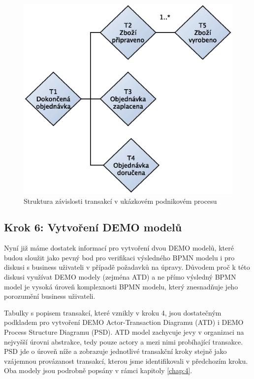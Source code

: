 \begin{figure}[htbp]
\centering
\includegraphics[scale=0.7]{obrazky/result-structure-chart}
\caption{Struktura závislosti transakcí v ukázkovém podnikovém procesu}
\label{fig:result_structure_chart}
\end{figure}

\subsection{Krok 6: Vytvoření DEMO modelů}
Nyní již máme dostatek informací pro vytvoření dvou DEMO modelů, které budou sloužit jako pevný bod pro verifikaci výsledného BPMN modelu i pro diskusi s business uživateli v případě požadavků na úpravy. Důvodem proč k této diskusi využívat DEMO modely (zejména ATD) a ne přímo výsledný BPMN model je vysoká úroveň komplexnosti BPMN modelu, který znesnadňuje jeho porozumění business uživateli.

Tabulky s popisem transakcí, které vznikly v kroku 4, jsou dostatečným podkladem pro vytvoření DEMO Actor-Transaction Diagramu (ATD) i DEMO Process Structure Diagramu (PSD). ATD model zachycuje jevy v organizaci na nejvyšší úrovni abstrakce, tedy pouze actory a mezi nimi probíhající transakce. PSD jde o úroveň níže a zobrazuje jednotlivé transakční kroky stejně jako vzájemnou provázanost transakcí, kterou jsme identifikovali v předchozím kroku. Oba modely jsou podrobně popsány v rámci kapitoly \ref{chap:4}.

